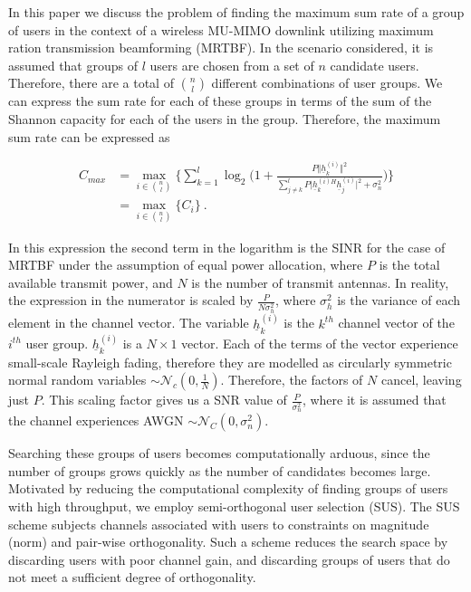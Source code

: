 In this paper we discuss the problem of finding the maximum sum rate of a group of users in the context of a wireless MU-MIMO downlink utilizing maximum ration transmission beamforming (MRTBF). In the scenario considered, it is assumed that groups of $l$ users are chosen from a set of $n$ candidate users. Therefore, there are a total of $\binom{n}{l}$ different combinations of user groups.  We can express the sum rate for each of these groups in terms of the sum of the Shannon capacity for each of the users in the group. Therefore, the maximum sum rate can be expressed as

\begin{equation}\label{eq:c_max}
    \begin{aligned}
    C_{max} &= \max_{i\in\binom{n}{l}}\bigg\lbrace \sum_{k=1}^l\log_2\bigg(1+\frac{P\Vert\underline{h}^{(i)}_k \Vert^2}{\sum_{j\neq k}^lP\vert \underline{h}^{(i)H}_k \underline{h}^{(i)}_j\vert^2 + \sigma_n^2}\bigg)\bigg\rbrace \\
    &= \max_{i\in\binom{n}{l}}\lbrace C_i\rbrace \ .
    \end{aligned}
\end{equation}

In this expression the second term in the logarithm is the SINR for the case of MRTBF under the assumption of equal power allocation, where $P$ is the total available transmit power, and $N$ is the number of transmit antennas. In reality, the expression in the numerator is scaled by $\frac{P}{N\sigma_h^2}$, where $\sigma_h^2$ is the variance of each element in the channel vector.  The variable $\underline{h}_k^{(i)}$ is the $k^{th}$ channel vector of the $i^{th}$ user group. $\underline{h}_k^{(i)}$ is a $N\times 1$ vector. Each of the terms of the vector experience small-scale Rayleigh fading, therefore they are modelled as circularly symmetric normal random variables $\sim\mathcal{N}_c(0,\frac{1}{N})$. Therefore, the factors of $N$ cancel, leaving just $P$. This scaling factor gives us a SNR value of $\frac{P}{\sigma_n^2}$, where it is assumed that the channel experiences AWGN $\sim\mathcal{N}_C(0,\sigma_n^2)$.

Searching these groups of users becomes computationally arduous, since the number of groups grows quickly as the number of candidates becomes large. Motivated by reducing the computational complexity of finding groups of users with high throughput, we employ semi-orthogonal user selection (SUS). The SUS scheme subjects channels associated with users to constraints on magnitude (norm) and pair-wise orthogonality. Such a scheme reduces the search space by discarding users with poor channel gain, and discarding groups of users that do not meet a sufficient degree of orthogonality.

